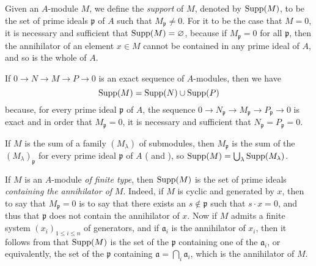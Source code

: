 \begin{env}[1.7.1]
\label{0.1.7.1}
Given an $A$-module $M$, we define the \emph{support} of $M$, denoted by ${\mathop{\mathrm{Supp}}\nolimits}(M)$, to be the set of prime ideals $\mathfrak{p}$ of $A$ such that $M_\mathfrak{p}\neq 0$.
For it to be the case that $M=0$, it is necessary and sufficient that ${\mathop{\mathrm{Supp}}\nolimits}(M)=\varnothing$, because if $M_\mathfrak{p}=0$ for all $\mathfrak{p}$, then the annihilator of an element $x\in M$ cannot be contained in any prime ideal of $A$, and so is the whole of $A$.
\end{env}

\begin{env}[1.7.2]
\label{0.1.7.2}
If $0\to N\to M\to P\to 0$ is an exact sequence of $A$-modules, then we have
\[
  {\mathop{\mathrm{Supp}}\nolimits}(M)={\mathop{\mathrm{Supp}}\nolimits}(N)\cup{\mathop{\mathrm{Supp}}\nolimits}(P)
\]
because, for every prime ideal $\mathfrak{p}$ of $A$, the sequence $0\to N_\mathfrak{p}\to M_\mathfrak{p}\to P_\mathfrak{p}\to 0$ is exact  and in order that $M_\mathfrak{p}=0$, it is necessary and sufficient that $N_\mathfrak{p}=P_\mathfrak{p}=0$.
\end{env}

\begin{env}[1.7.3]
\label{0.1.7.3}
If $M$ is the sum of a family $(M_\lambda)$ of submodules, then $M_\mathfrak{p}$ is the sum of the $(M_\lambda)_\mathfrak{p}$ for every prime ideal $\mathfrak{p}$ of $A$ ( and ), so ${\mathop{\mathrm{Supp}}\nolimits}(M)=\bigcup_\lambda{\mathop{\mathrm{Supp}}\nolimits}(M_\lambda)$.
\end{env}

\begin{env}[1.7.4]
\label{0.1.7.4}
If $M$ is an $A$-module \emph{of finite type}, then ${\mathop{\mathrm{Supp}}\nolimits}(M)$ is the set of prime ideals \emph{containing the annihilator of} $M$.
Indeed, if $M$ is cyclic and generated by $x$, then to say that $M_\mathfrak{p}=0$ is to say that there exists an $s\not\in\mathfrak{p}$ such that $s\cdot x=0$, and thus that $\mathfrak{p}$ does not contain the annihilator of $x$.
Now if $M$ admits a finite system $(x_i)_{1\leq i\leq n}$ of generators, and if $\mathfrak{a}_i$ is the annihilator of $x_i$, then it follows from  that ${\mathop{\mathrm{Supp}}\nolimits}(M)$ is
the set of the $\mathfrak{p}$ containing one of the $\mathfrak{a}_i$, or equivalently, the set of the $\mathfrak{p}$ containing $\mathfrak{a}=\bigcap_i\mathfrak{a}_i$, which is the annihilator of $M$.
\end{env}

